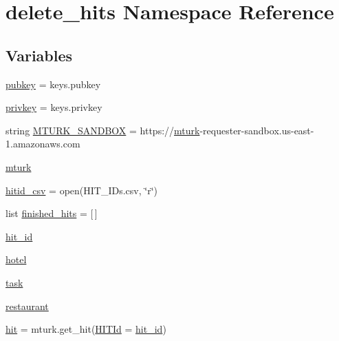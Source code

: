 \hypertarget{namespacedelete__hits}{}\section{delete\+\_\+hits Namespace Reference}
\label{namespacedelete__hits}
\subsection*{Variables}
\begin{DoxyCompactItemize}
\item 
\mbox{\hyperlink{namespacedelete__hits_a472244c9add0e4115ce313312dde7224}{pubkey}} = keys.\+pubkey
\item 
\mbox{\hyperlink{namespacedelete__hits_ae5335a2167ab5606ba0586b71c1bbf8c}{privkey}} = keys.\+privkey
\item 
string \mbox{\hyperlink{namespacedelete__hits_ae62b2c698fe34f48fcc67433b6495a00}{M\+T\+U\+R\+K\+\_\+\+S\+A\+N\+D\+B\+OX}} = \textquotesingle{}https\+://\mbox{\hyperlink{namespacedelete__hits_a5d236ec2d0fb7be80dec953c4f7564d7}{mturk}}-\/requester-\/sandbox.\+us-\/east-\/1.amazonaws.\+com\textquotesingle{}
\item 
\mbox{\hyperlink{namespacedelete__hits_a5d236ec2d0fb7be80dec953c4f7564d7}{mturk}}
\item 
\mbox{\hyperlink{namespacedelete__hits_aaa4760a5f94c7530731d37dd4be6c57e}{hitid\+\_\+csv}} = open(\textquotesingle{}H\+I\+T\+\_\+\+I\+Ds.\+csv\textquotesingle{}, \char`\"{}r\char`\"{})
\item 
list \mbox{\hyperlink{namespacedelete__hits_a8dba1b20704c19a36658bf6683bbf758}{finished\+\_\+hits}} = \mbox{[}$\,$\mbox{]}
\item 
\mbox{\hyperlink{namespacedelete__hits_a8666d258bbc7373ec4916e210f207935}{hit\+\_\+id}}
\item 
\mbox{\hyperlink{namespacedelete__hits_a14bfea709a79fbd8d11cc6f56496c6c6}{hotel}}
\item 
\mbox{\hyperlink{namespacedelete__hits_aa4d42044193f96ecc0d82daab68fb0e6}{task}}
\item 
\mbox{\hyperlink{namespacedelete__hits_ad7a5e066484bec8866342ed2e921cd79}{restaurant}}
\item 
\mbox{\hyperlink{namespacedelete__hits_a9457708af3cc7fec04a51cd32cbf4be8}{hit}} = mturk.\+get\+\_\+hit(\mbox{\hyperlink{namespacedelete__hits_a0db29e7cb8ba641a52d4d38422671994}{H\+I\+T\+Id}} = \mbox{\hyperlink{namespacedelete__hits_a8666d258bbc7373ec4916e210f207935}{hit\+\_\+id}})
\item 

\end{DoxyCompactItemize}
